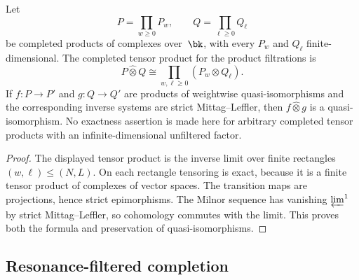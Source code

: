 \begin{lemma}
\label{lem:finite-resonance-tensor-exact}
Let
\[
P=\prod_{w\ge0}P_w,\qquad
Q=\prod_{\ell\ge0}Q_\ell
\]
be completed products of complexes over~$\bk$, with every
$P_w$ and $Q_\ell$ finite-dimensional.  The completed tensor product
for the product filtrations is
\[
P\widehat\otimes Q
\cong
\prod_{w,\ell\ge0}(P_w\otimes Q_\ell).
\]
If $f:P\to P'$ and $g:Q\to Q'$ are products of weightwise
quasi-isomorphisms and the corresponding inverse systems are strict
Mittag--Leffler, then
$f\widehat\otimes g$ is a quasi-isomorphism.  No exactness assertion is
made here for arbitrary completed tensor products with an
infinite-dimensional unfiltered factor.
\end{lemma}

\begin{proof}
The displayed tensor product is the inverse limit over finite
rectangles $(w,\ell)\le(N,L)$.  On each rectangle tensoring is exact,
because it is a finite tensor product of complexes of vector spaces.
The transition maps are projections, hence strict epimorphisms.  The
Milnor sequence has vanishing $\varprojlim^1$ by strict
Mittag--Leffler, so cohomology commutes with the limit.  This proves
both the formula and preservation of quasi-isomorphisms.
\end{proof}

\subsection{Resonance-filtered completion}

